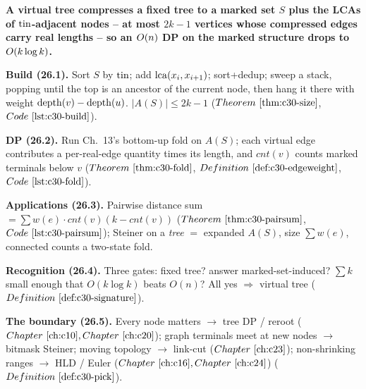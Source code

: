 \begin{quickref}
\textbf{A virtual tree compresses a fixed tree to a marked set \(S\) plus the LCAs of
\(\operatorname{tin}\)-adjacent nodes -- at most \(2k-1\) vertices whose compressed edges carry real
lengths -- so an \(O(n)\) DP on the marked structure drops to \(O(k\log k)\).}

\medskip
\textbf{Build (26.1).} Sort \(S\) by \(\operatorname{tin}\); add \(\operatorname{lca}(x_i,x_{i+1})\); sort+dedup; sweep a
stack, popping until the top is an ancestor of the current node, then hang it there with
weight \(\operatorname{depth}(v)-\operatorname{depth}(u)\). \(|A(S)|\le 2k-1\) (\(\thmref{c30-size}\), \(\coderef{c30-build}\)).

\medskip
\textbf{DP (26.2).} Run Ch.~13's bottom-up fold on \(A(S)\); each virtual edge contributes a
per-real-edge quantity times its length, and \(\mathit{cnt}(v)\) counts marked terminals below
\(v\) (\(\thmref{c30-fold}\), \(\defref{c30-edgeweight}\), \(\coderef{c30-fold}\)).

\medskip
\textbf{Applications (26.3).} Pairwise distance sum \(=\sum\mathit{w}(e)\cdot\mathit{cnt}(v)(k-\mathit{cnt}(v))\)
(\(\thmref{c30-pairsum}\), \(\coderef{c30-pairsum}\)); Steiner on a \emph{tree} \(=\) expanded \(A(S)\),
size \(\sum\mathit{w}(e)\), connected counts a two-state fold.

\medskip
\textbf{Recognition (26.4).} Three gates: fixed tree? answer marked-set-induced? \(\sum k\) small
enough that \(O(k\log k)\) beats \(O(n)\)? All yes \(\Rightarrow\) virtual tree (\(\defref{c30-signature}\)).

\medskip
\textbf{The boundary (26.5).} Every node matters \(\to\) tree DP / reroot (\(\chref{c10},\chref{c20}\));
graph terminals meet at new nodes \(\to\) bitmask Steiner; moving topology \(\to\) link-cut
(\(\chref{c23}\)); non-shrinking ranges \(\to\) HLD / Euler (\(\chref{c16},\chref{c24}\))
(\(\defref{c30-pick}\)).
\end{quickref}

